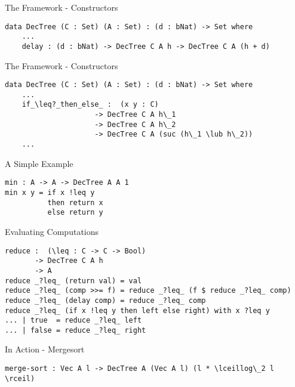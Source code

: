 \documentclass[11pt]{beamer}
\begin{document}
    \begin{frame}[fragile]{The Framework - Constructors}
        \begin{lstlisting}[emph={DecTree,delay}]
data DecTree (C : Set) (A : Set) : (d : bNat) -> Set where
    ...
    delay : (d : bNat) -> DecTree C A h -> DecTree C A (h + d)
        \end{lstlisting}
    \end{frame}

    \begin{frame}[fragile]{The Framework - Constructors}
        \begin{lstlisting}[emph={DecTree}]
data DecTree (C : Set) (A : Set) : (d : bNat) -> Set where
    ...
    if_\leq?_then_else_ :  (x y : C)
                     -> DecTree C A h\_1
                     -> DecTree C A h\_2
                     -> DecTree C A (suc (h\_1 \lub h\_2))
    ...
        \end{lstlisting}
    \end{frame}

    \begin{frame}[fragile]{A Simple Example}
        \begin{lstlisting}[emph={min,if,then,else,return}]
min : A -> A -> DecTree A A 1
min x y = if x !leq y
          then return x
          else return y
        \end{lstlisting}
    \end{frame}

    \begin{frame}[fragile]{Evaluating Computations}
        \begin{lstlisting}[emph={reduce}]
reduce :  (\leq : C -> C -> Bool)
       -> DecTree C A h
       -> A
reduce _?leq_ (return val) = val
reduce _?leq_ (comp >>= f) = reduce _?leq_ (f $ reduce _?leq_ comp)
reduce _?leq_ (delay comp) = reduce _?leq_ comp
reduce _?leq_ (if x !leq y then left else right) with x ?leq y
... | true  = reduce _?leq_ left
... | false = reduce _?leq_ right
        \end{lstlisting}
    \end{frame}

    \begin{frame}[fragile]{In Action - Mergesort}
        \begin{lstlisting}[emph={merge,sort,bound,split,return},showlines=true]
merge-sort : Vec A l -> DecTree A (Vec A l) (l * \lceillog\_2 l \rceil)











        \end{lstlisting}
    \end{frame}
\end{document}
